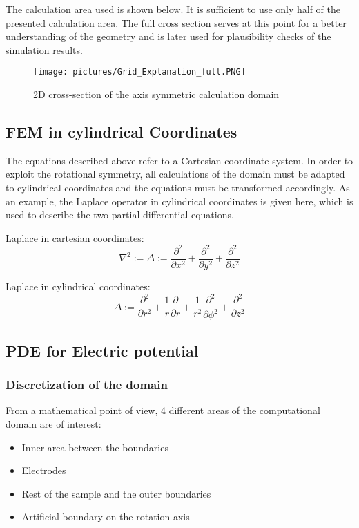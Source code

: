\documentclass[parskip=half, titlepage=yes, 12pt, BCOR=12mm, DIV=calc]{scrartcl}
\begin{document}
The calculation area used is shown below. It is sufficient to use only half of the presented calculation area. The full cross section serves at this point for a better understanding of the geometry and is later used for plausibility checks of the simulation results.

\begin{figure}[H]
    \centering
    \texttt{[image: pictures/Grid\_Explanation\_full.PNG]}
    \caption{2D cross-section of the axis symmetric calculation domain}
    \label{fig:Grid_Explanation_full}
\end{figure}

\subsection{FEM in cylindrical Coordinates}

The equations described above refer to a Cartesian coordinate system. In order to exploit the rotational symmetry, all calculations of the domain must be adapted to cylindrical coordinates and the equations must be transformed accordingly. As an example, the Laplace operator in cylindrical coordinates is given here, which is used to describe the two partial differential equations.
 
Laplace in cartesian coordinates:
\begin{equation}
    \nabla^2 := \Delta := \frac{\partial^2}{\partial x^2} + \frac{\partial^2}{\partial y^2} + \frac{\partial^2}{\partial z^2}
\end{equation}

Laplace in cylindrical coordinates:
\begin{equation}
    \Delta := \frac{\partial^2}{\partial r^2} + \frac{1}{r} \frac{\partial}{\partial r} + \frac{1}{r^2} \frac{\partial^2}{\partial \phi^2} + \frac{\partial^2}{\partial z^2}
\end{equation}



\subsection{PDE for Electric potential}

\subsubsection{Discretization of the domain}

From a mathematical point of view, 4 different areas of the computational domain are of interest:
\begin{itemize}
    \item Inner area between the boundaries
    \item Electrodes 
    \item Rest of the sample and the outer boundaries
    \item Artificial boundary on the rotation axis
\end{itemize}
\end{document}

